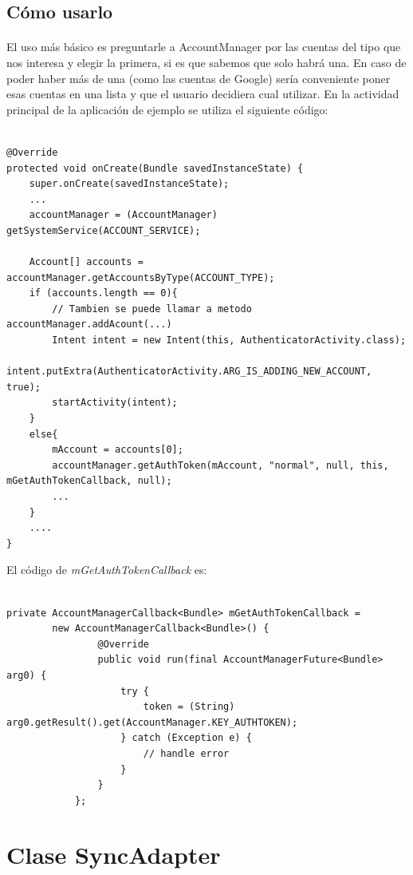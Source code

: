 \documentclass[10pt]{extarticle}
\begin{document}
\subsection{Cómo usarlo}

\paragraph{}
El uso más básico es preguntarle a AccountManager por las cuentas del tipo que nos interesa y elegir la primera, si es que sabemos que solo habrá una. En caso de poder haber más de una (como las cuentas de Google) sería conveniente poner esas cuentas en una lista y que el usuario decidiera cual utilizar. En la actividad principal de la aplicación de ejemplo se utiliza el siguiente código:

\begin{lstlisting}

@Override
protected void onCreate(Bundle savedInstanceState) {
	super.onCreate(savedInstanceState);
	...
    accountManager = (AccountManager) getSystemService(ACCOUNT_SERVICE);

    Account[] accounts = accountManager.getAccountsByType(ACCOUNT_TYPE);
    if (accounts.length == 0){
        // Tambien se puede llamar a metodo accountManager.addAcount(...)
        Intent intent = new Intent(this, AuthenticatorActivity.class);
        intent.putExtra(AuthenticatorActivity.ARG_IS_ADDING_NEW_ACCOUNT, true);
        startActivity(intent);
    }
    else{
        mAccount = accounts[0];
        accountManager.getAuthToken(mAccount, "normal", null, this, mGetAuthTokenCallback, null);
	    ...
    }
    ....
}

\end{lstlisting}

El código de \textit{mGetAuthTokenCallback} es:

\begin{lstlisting}

private AccountManagerCallback<Bundle> mGetAuthTokenCallback =
	    new AccountManagerCallback<Bundle>() {
        		@Override
        		public void run(final AccountManagerFuture<Bundle> arg0) {
            		try {
                		token = (String) arg0.getResult().get(AccountManager.KEY_AUTHTOKEN);
            		} catch (Exception e) {
                		// handle error
            		}
        		}
    		};

\end{lstlisting}

\section{Clase SyncAdapter}
\end{document}
